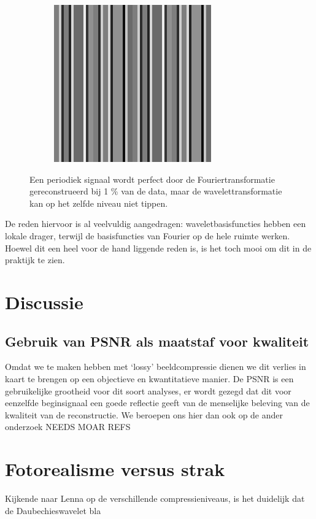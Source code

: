 \begin{figure}[h]
\begin{subfigure}[b]{0.25\textwidth}
    \includegraphics[width=\textwidth]{plaatjes/sin.png}
  \end{subfigure}
  \caption{Een periodiek signaal wordt perfect door de Fouriertransformatie gereconstrueerd bij 1 \% van de data, maar de wavelettransformatie kan op het zelfde niveau niet tippen.}
\end{figure}

De reden hiervoor is al veelvuldig aangedragen: waveletbasisfuncties hebben een lokale drager, terwijl de basisfuncties van Fourier op de hele ruimte werken. Hoewel dit een heel voor de hand liggende reden is, is het toch mooi om dit in de praktijk te zien.

\section{Discussie}
\subsection{Gebruik van PSNR als maatstaf voor kwaliteit}
Omdat we te maken hebben met `lossy' beeldcompressie dienen we dit verlies in kaart te brengen op een 
objectieve en kwantitatieve manier. 
De PSNR is een gebruikelijke grootheid voor dit soort analyses, er wordt gezegd dat dit voor eenzelfde 
beginsignaal een goede reflectie geeft van de menselijke beleving van de kwaliteit van de reconstructie.
We beroepen ons hier dan ook op de ander onderzoek NEEDS MOAR REFS

\section{Fotorealisme versus strak}
Kijkende naar Lenna op de verschillende compressieniveaus, is het duidelijk dat de Daubechieswavelet bla
